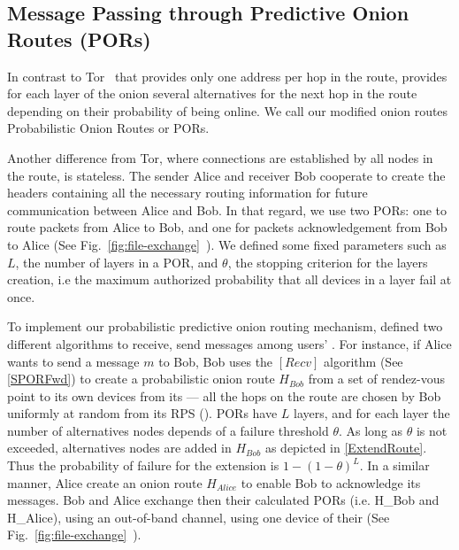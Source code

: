 

\subsection{Message Passing through Predictive Onion Routes (PORs)}
\label{sec:message_passing}


In contrast to Tor~\cite{Tor} that provides only one address per hop
in the route, \name provides for each layer of the onion several
alternatives for the next hop in the route depending on their
probability of being online. We call our modified onion routes
Probabilistic Onion Routes or PORs.

Another difference from Tor, where connections are established by all
nodes in the route, \name is stateless. The sender
Alice and receiver Bob cooperate to create the headers containing all
the necessary routing information for future communication between
Alice and Bob. In that regard, we use two PORs: one to route packets from Alice to
Bob, and one for packets acknowledgement from Bob to Alice (See
Fig.~\ref{fig:file-exchange}~). We defined some fixed
parameters such as $L$, the number of layers in a POR, and
$\theta$, the stopping criterion for the layers creation, i.e the
maximum authorized  probability that all devices in a layer fail at
once.

To implement our  probabilistic
predictive onion routing mechanism, \name defined two different algorithms to
receive, send messages among users' \squad. For instance,
if Alice wants to send a message \(m\) to Bob, Bob uses the
\([Recv]\) algorithm (See \cref{SPORFwd}) to create a probabilistic onion route \(H_{Bob}\) from
 a set of rendez-vous point to its own devices from its \squad --- all the hops on the route are 
chosen by Bob uniformly at random from its RPS (\view).
PORs have \(L\) layers, and for each layer the number of
alternatives nodes depends of a failure threshold \(\theta\). 
As long as \(\theta\) is not exceeded, alternatives nodes are added in
\(H_{Bob}\) as depicted in \cref{ExtendRoute}. Thus the probability of
failure for the extension is \(1 - (1 - \theta)^L\). In a similar
manner, Alice create an onion route \(H_{Alice}\) to enable Bob to
acknowledge its messages. Bob and Alice exchange then their calculated
PORs (i.e. H_{Bob} and H_{Alice}), using an
out-of-band channel, \eg using one device of their \squad (See
Fig.~\ref{fig:file-exchange}~).

